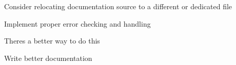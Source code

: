 
\begin{DoxyRefList}
\item[\label{todo__todo000003}%
\hypertarget{todo__todo000003}{}%
page \hyperlink{index}{Attendance System Documentation} ]Consider relocating documentation source to a different or dedicated file 
\item[\label{todo__todo000001}%
\hypertarget{todo__todo000001}{}%
Global \hyperlink{class_i2_c_a27cbfcfd33a3f275d6a259b92bbd2a21}{I2C\+:\+:I2C} (char $\ast$, int)]Implement proper error checking and handling  
\item[\label{todo__todo000002}%
\hypertarget{todo__todo000002}{}%
Global \hyperlink{class_i2_c_a93a4ef6c66595b958b221fa641b7cda4}{I2C\+:\+:write} (char $\ast$)]There\textquotesingle{}s a better way to do this  
\item[\label{todo__todo000004}%
\hypertarget{todo__todo000004}{}%
Class \hyperlink{class_l_c_d}{L\+CD} ]Write better documentation 
\end{DoxyRefList}